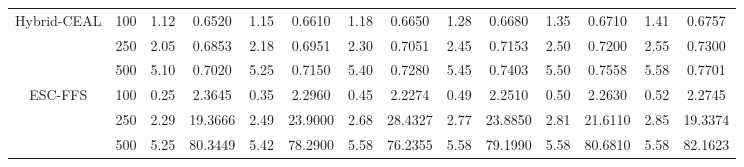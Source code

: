 \documentclass[preprint,12pt]{elsarticle}
\begin{document}
\begin{table}[!t]
{\begin{tabular}{cc|cccccccccccc}
 \multirow{3}{*}{Hybrid-CEAL}   &  100    &  1.12          &  0.6520                    &  1.15          &  0.6610                    &  1.18          &  0.6650                    &  1.28          &  0.6680                    &  1.35          &  0.6710                    &  1.41          &  0.6757          \\
                                       &  250    &  2.05          &  0.6853                    &  2.18          &  0.6951                    &  2.30          &  0.7051                    &  2.45          &  0.7153                    &  2.50          &  0.7200                    &  2.55          &  0.7300          \\
                                       &  500    &  5.10          &  0.7020                    &  5.25          &  0.7150                    &  5.40          &  0.7280                    &  5.45          &  0.7403                    &  5.50          &  0.7558                    &  5.58          &  0.7701          \\ \hline

\multirow{3}{*}{ESC-FFS}               & 100    & 0.25          & 2.3645                    & 0.35          & 2.2960                    & 0.45          & 2.2274                    & 0.49          & 2.2510                    & 0.50          & 2.2630                    & 0.52          & 2.2745          \\
                                       & 250    & 2.29          & 19.3666                   & 2.49          & 23.9000                   & 2.68          & 28.4327                   & 2.77          & 23.8850                   & 2.81          & 21.6110                   & 2.85          & 19.3374         \\
                                       & 500    & 5.25          & 80.3449                   & 5.42          & 78.2900                   & 5.58          & 76.2355                   & 5.58          & 79.1990                   & 5.58          & 80.6810                   & 5.58          & 82.1623         \\ \hline


\end{tabular}}
\end{table}
\end{document}
